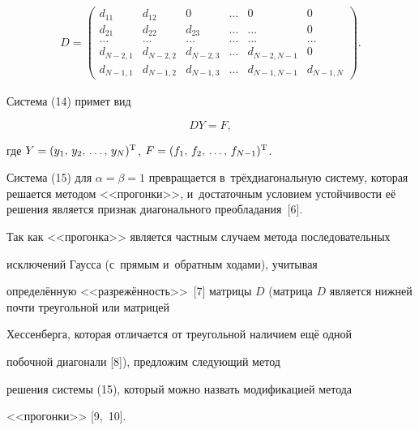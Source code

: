 \begin{eqnarray*} 

D=\left( 

\begin{array}{cccccc} 

d_{11} & d_{12} & 0 & \dots & 0 & 0 \\ 

d_{21} & d_{22} & d_{23} & \dots & \dots & 0 \\ 

\dots & \dots & \dots & \dots & \dots & \dots \\ 

d_{N-2,1} & d_{N-2,2} & d_{N-2,3} & \dots & d_{N-2,N-1} & 0 \\ 

d_{N-1,1} & d_{N-1,2} & d_{N-1,3} & \dots & d_{N-1,N-1} & d_{N-1,N} 

\end{array} 

\right). 

\end{eqnarray*} 



Система (14) примет вид 

\begin{equation} 

\label{ch15} 

DY=F, 

\end{equation} 

где $Y=(y_1,\,y_2,\,\dots ,\, y_{N})^{\rm T}$, $F=(f_1,\, f_2,\, \dots,\, f_{N-1})^{\rm T}$. 

Система (15) для $\alpha=\beta=1$ превращается в~трёхдиагональную систему, которая решается методом <<прогонки>>, и~достаточным условием устойчивости её решения является признак диагонального преобладания~[6]. 

Так как <<прогонка>> является частным случаем метода последовательных  

исключений Гаусса (с~прямым и~обратным ходами), учитывая 

определённую <<разрежённость>>~[7] матрицы $D$ (матрица $D$ является нижней почти треугольной или матрицей 

Хессенберга, которая отличается от треугольной наличием ещё одной 

побочной диагонали [8]), предложим следующий метод 

решения системы (15), который можно назвать модификацией метода 

<<прогонки>> [9,~10].



